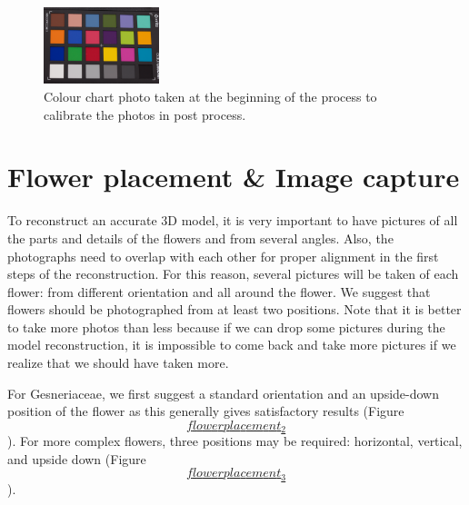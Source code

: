 \documentclass[
]{book}
\theoremstyle{definition}
\theoremstyle{definition}
\theoremstyle{definition}
\theoremstyle{definition}
\theoremstyle{remark}
\begin{document}
\begin{figure}
\hypertarget{colorchart}{%
\centering
\includegraphics[width=0.3\textwidth,height=\textheight]{Figures/chart_example.png}
\caption{Colour chart photo taken at the beginning of the process to calibrate
the photos in post process.}\label{colorchart}
}
\end{figure}

\hypertarget{flower-placement-image-capture}{%
\section{Flower placement \& Image capture}\label{flower-placement-image-capture}}

To reconstruct an accurate 3D model, it is very important to have
pictures of all the parts and details of the flowers and from several
angles. Also, the photographs need to overlap with each other for proper
alignment in the first steps of the reconstruction. For this reason,
several pictures will be taken of each flower: from different
orientation and all around the flower. We suggest that flowers should be
photographed from at least two positions. Note that it is better to take
more photos than less because if we can drop some pictures during the
model reconstruction, it is impossible to come back and take more
pictures if we realize that we should have taken more.

For Gesneriaceae, we first suggest a standard orientation and an
upside-down position of the flower as this generally gives satisfactory
results (Figure
\protect\hyperlink{flowerplacement_2}{\[flowerplacement_2\]}). For more complex flowers, three
positions may be required: horizontal, vertical, and upside down (Figure
\protect\hyperlink{flowerplacement_3}{\[flowerplacement_3\]}).
\end{document}
